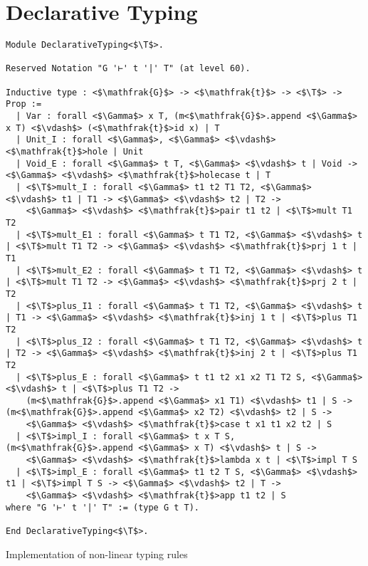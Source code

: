 \section{Declarative Typing}

\begin{listing}[t]
\begin{verbatim}
Module DeclarativeTyping<$\T$>.

Reserved Notation "G '⊢' t '|' T" (at level 60).

Inductive type : <$\mathfrak{G}$> -> <$\mathfrak{t}$> -> <$\T$> -> Prop :=
  | Var : forall <$\Gamma$> x T, (m<$\mathfrak{G}$>.append <$\Gamma$> x T) <$\vdash$> (<$\mathfrak{t}$>id x) | T
  | Unit_I : forall <$\Gamma$>, <$\Gamma$> <$\vdash$> <$\mathfrak{t}$>hole | Unit
  | Void_E : forall <$\Gamma$> t T, <$\Gamma$> <$\vdash$> t | Void -> <$\Gamma$> <$\vdash$> <$\mathfrak{t}$>holecase t | T
  | <$\T$>mult_I : forall <$\Gamma$> t1 t2 T1 T2, <$\Gamma$> <$\vdash$> t1 | T1 -> <$\Gamma$> <$\vdash$> t2 | T2 -> 
    <$\Gamma$> <$\vdash$> <$\mathfrak{t}$>pair t1 t2 | <$\T$>mult T1 T2
  | <$\T$>mult_E1 : forall <$\Gamma$> t T1 T2, <$\Gamma$> <$\vdash$> t | <$\T$>mult T1 T2 -> <$\Gamma$> <$\vdash$> <$\mathfrak{t}$>prj 1 t | T1
  | <$\T$>mult_E2 : forall <$\Gamma$> t T1 T2, <$\Gamma$> <$\vdash$> t | <$\T$>mult T1 T2 -> <$\Gamma$> <$\vdash$> <$\mathfrak{t}$>prj 2 t | T2
  | <$\T$>plus_I1 : forall <$\Gamma$> t T1 T2, <$\Gamma$> <$\vdash$> t | T1 -> <$\Gamma$> <$\vdash$> <$\mathfrak{t}$>inj 1 t | <$\T$>plus T1 T2
  | <$\T$>plus_I2 : forall <$\Gamma$> t T1 T2, <$\Gamma$> <$\vdash$> t | T2 -> <$\Gamma$> <$\vdash$> <$\mathfrak{t}$>inj 2 t | <$\T$>plus T1 T2
  | <$\T$>plus_E : forall <$\Gamma$> t t1 t2 x1 x2 T1 T2 S, <$\Gamma$> <$\vdash$> t | <$\T$>plus T1 T2 ->
    (m<$\mathfrak{G}$>.append <$\Gamma$> x1 T1) <$\vdash$> t1 | S -> (m<$\mathfrak{G}$>.append <$\Gamma$> x2 T2) <$\vdash$> t2 | S -> 
    <$\Gamma$> <$\vdash$> <$\mathfrak{t}$>case t x1 t1 x2 t2 | S
  | <$\T$>impl_I : forall <$\Gamma$> t x T S, (m<$\mathfrak{G}$>.append <$\Gamma$> x T) <$\vdash$> t | S -> 
    <$\Gamma$> <$\vdash$> <$\mathfrak{t}$>lambda x t | <$\T$>impl T S
  | <$\T$>impl_E : forall <$\Gamma$> t1 t2 T S, <$\Gamma$> <$\vdash$> t1 | <$\T$>impl T S -> <$\Gamma$> <$\vdash$> t2 | T -> 
    <$\Gamma$> <$\vdash$> <$\mathfrak{t}$>app t1 t2 | S
where "G '⊢' t '|' T" := (type G t T).

End DeclarativeTyping<$\T$>.
\end{verbatim}
\caption{Implementation of non-linear typing rules}
\label{listing:coq-declarativetypingT}
\end{listing}

